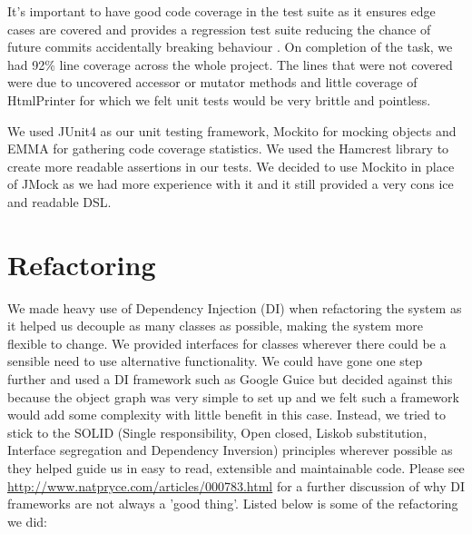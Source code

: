 \documentclass[a4paper,11pt]{article}
\begin{document}
It's important to have good code coverage in the test suite as it ensures edge cases are covered and provides a regression test suite reducing the chance of future commits accidentally breaking behaviour . On completion of the task, we had 92\% line coverage across the whole project. The lines that were not covered were due to uncovered accessor or mutator methods and little coverage of HtmlPrinter for which we felt unit tests would be very brittle and pointless.

We used JUnit4 as our unit testing framework, Mockito for mocking objects and EMMA for gathering code coverage statistics. We used the Hamcrest library to create more readable assertions in our tests. We decided to use Mockito in place of JMock as we had more experience with it and it still provided a very cons ice and readable DSL.

\section{Refactoring}

We made heavy use of Dependency Injection (DI) when refactoring the system as it helped us decouple as many classes as possible, making the system more flexible to change. We provided interfaces for classes wherever there could be a sensible need to use alternative functionality. We could have gone one step further and used a DI framework such as Google Guice but decided against this because the object graph was very simple to set up and we felt such a framework would add some complexity with little benefit in this case. Instead, we tried to stick to the SOLID (Single responsibility, Open closed, Liskob substitution, Interface segregation and Dependency Inversion) principles wherever possible as they helped guide us in easy to read, extensible and maintainable code. Please see \url{http://www.natpryce.com/articles/000783.html} for a further discussion of why DI frameworks are not always a 'good thing'. Listed below is some of the refactoring we did:
\end{document}
